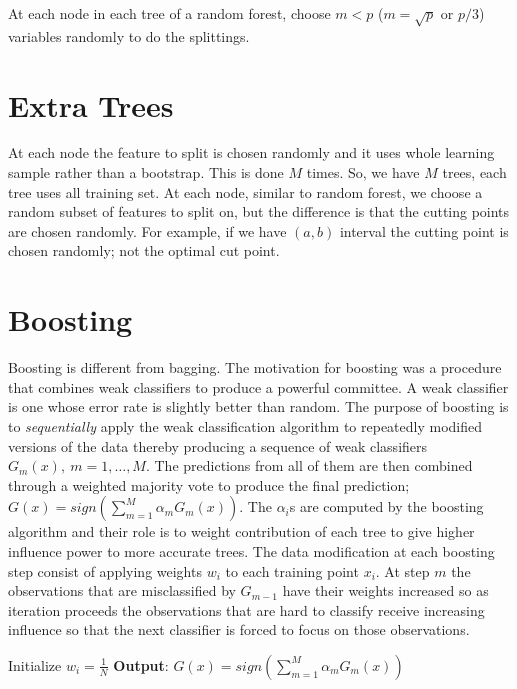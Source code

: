 At each node in each tree of a random forest, 
choose $m < p$ ($m=\sqrt{p}$ or $p/3$) variables randomly to do the
splittings. 
\section{Extra Trees}
At each node the feature to split is chosen randomly
and it uses whole learning sample rather than a bootstrap.
This is done $M$ times. 
So, we have $M$ trees, each tree uses all training set. At each node,
similar to random forest, we choose a random subset of 
features to split on, but the difference is that the cutting points
are chosen randomly. For example, if we have $(a, b)$ interval the
cutting point is chosen randomly; not the optimal cut point.

\section{Boosting}
Boosting is different from bagging.
The motivation for boosting was a procedure that
combines weak classifiers to produce a powerful committee.
A weak classifier is one whose error rate is slightly better than
random. The purpose of boosting is to \emph{sequentially}
apply the weak classification algorithm to repeatedly modified versions 
of the data thereby producing a sequence of weak classifiers $G_m(x),~m=1, \dots, M$. The predictions from all of them are then combined through a
weighted majority vote to produce the final prediction; $G(x) = sign \left(\sum_{m=1}^M \alpha_m G_m(x) \right)$. The $\alpha_i$s are
computed by the boosting algorithm and their role is to weight contribution
of each tree to give higher influence power to more accurate trees.
The data modification at each boosting step consist of applying 
weights $w_i$ to each training point  $x_i$. At step $m$
the observations that are misclassified by $G_{m-1}$ have their weights increased so as iteration proceeds the observations that
are hard to classify receive increasing influence so that
the next classifier is forced to focus on those observations.

\begin{tcolorbox}
  \begin{algorithm}[H]
\SetAlgoLined
{}
  Initialize $w_i = \frac{1}{N}$\;
\textbf{Output}: $G(x) = sign \left( \sum_{m=1}^M \alpha_m G_m(x) \right)$
 \caption{Boosting}
\end{algorithm}
\end{tcolorbox}
